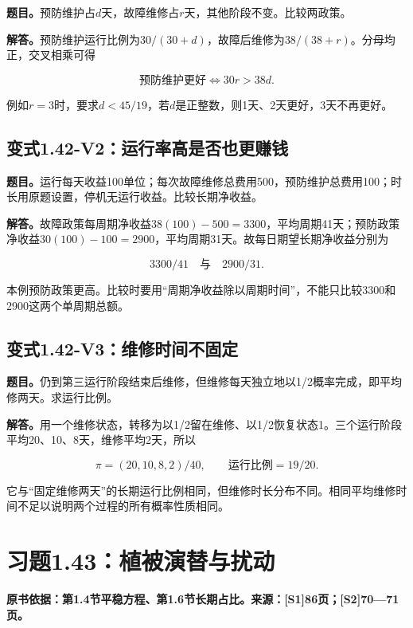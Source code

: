 \documentclass[
  11pt,
  a4paper,
  UTF8,
  fontset=fandol]{ctexart}
\begin{document}
\textbf{题目。}预防维护占\(d\)天，故障维修占\(r\)天，其他阶段不变。比较两政策。

\textbf{解答。}预防维护运行比例为\(30/(30+d)\)，故障后维修为\(38/(38+r)\)。分母均正，交叉相乘可得

\[
\boxed{\text{预防维护更好}\iff30r>38d.}
\]

例如\(r=3\)时，要求\(d<45/19\)，若\(d\)是正整数，则1天、2天更好，3天不再更好。

\subsection{变式1.42-V2：运行率高是否也更赚钱}\label{ux53d8ux5f0f1.42-v2ux8fd0ux884cux7387ux9ad8ux662fux5426ux4e5fux66f4ux8d5aux94b1}

\textbf{题目。}运行每天收益100单位；每次故障维修总费用500，预防维护总费用100；时长用原题设置，停机无运行收益。比较长期净收益。

\textbf{解答。}故障政策每周期净收益\(38(100)-500=3300\)，平均周期41天；预防政策净收益\(30(100)-100=2900\)，平均周期31天。故每日期望长期净收益分别为

\[
\boxed{3300/41\quad\text{与}\quad2900/31.}
\]

本例预防政策更高。比较时要用``周期净收益除以周期时间''，不能只比较3300和2900这两个单周期总额。

\subsection{变式1.42-V3：维修时间不固定}\label{ux53d8ux5f0f1.42-v3ux7ef4ux4feeux65f6ux95f4ux4e0dux56faux5b9a}

\textbf{题目。}仍到第三运行阶段结束后维修，但维修每天独立地以1/2概率完成，即平均修两天。求运行比例。

\textbf{解答。}用一个维修状态，转移为以1/2留在维修、以1/2恢复状态1。三个运行阶段平均20、10、8天，维修平均2天，所以

\[
\boxed{\pi=(20,10,8,2)/40,\qquad\text{运行比例}=19/20.}
\]

它与``固定维修两天''的长期运行比例相同，但维修时长分布不同。相同平均维修时间不足以说明两个过程的所有概率性质相同。

\section{习题1.43：植被演替与扰动}\label{ux4e60ux98981.43ux690dux88abux6f14ux66ffux4e0eux6270ux52a8}

\textbf{原书依据：第1.4节平稳方程、第1.6节长期占比。来源：{[}S1{]}86页；{[}S2{]}70---71页。}
\end{document}
